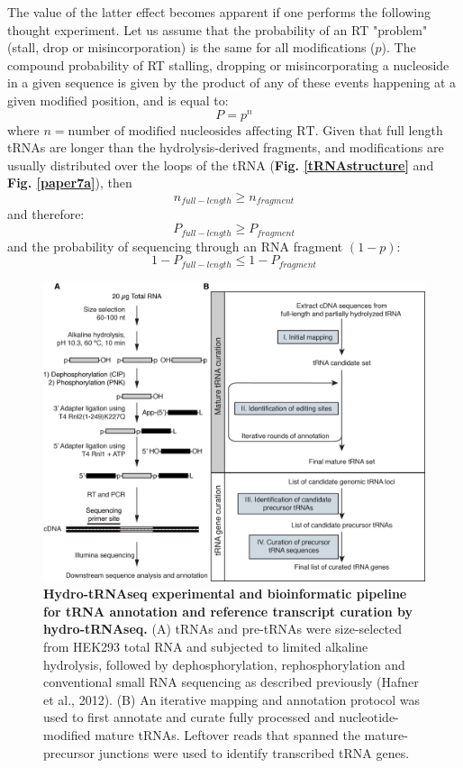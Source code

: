 \documentclass[12pt]{rockefeller}
\begin{document}
The value of the latter effect becomes apparent if one performs the following thought experiment. Let us assume that the probability of an RT "problem" (stall, drop or misincorporation) is the same for all modifications ($p$). The compound probability of RT stalling, dropping or misincorporating a nucleoside in a given sequence is given by the product of any of these events happening at a given modified position, and  is equal to: 
\begin{equation}
P = p^n
\end{equation}
where  $n = \text{number of modified nucleosides affecting RT}$. 
Given that full length tRNAs are longer than the hydrolysis-derived fragments, and modifications are usually distributed over the loops of the tRNA (\textbf{Fig. \ref{tRNAstructure}} and \textbf{Fig. \ref{paper7a}}), then 
\begin{equation}
n_{full-length} \geq n_{fragment} 
\end{equation}
and therefore: 
\begin{equation}
P_{full-length} \geq P_{fragment}
\end{equation}
and the probability of sequencing through an RNA fragment $(1-p)$:
\begin{equation}
1-P_{full-length} \leq 1-P_{fragment}
\end{equation}

\begin{figure}[!h]%
\centering
\includegraphics[width=\textwidth]{paper1.png}%
\caption[hydro-tRNAseq experimental and bioinformatic pipeline]{\textbf{Hydro-tRNAseq experimental and bioinformatic pipeline for tRNA annotation and reference transcript curation by hydro-tRNAseq.} (A) tRNAs and pre-tRNAs were size-selected from HEK293 total RNA and subjected to limited alkaline hydrolysis, followed by dephosphorylation, rephosphorylation and conventional small RNA sequencing as described previously (Hafner et al., 2012). (B) An iterative mapping and annotation protocol was used to first annotate and curate fully processed and nucleotide-modified mature tRNAs. Leftover reads that spanned the mature-precursor junctions were used to identify transcribed tRNA genes.}
\centering
\label{paper1}%
\end{figure}
\end{document}
